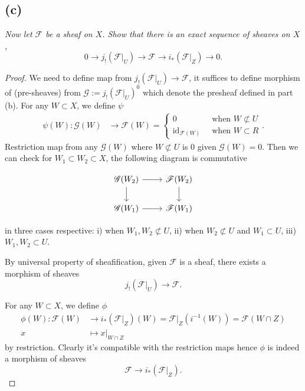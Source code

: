 \subsection{(c)}
\textit{Now let $\mathscr F$ be a sheaf on $X$. Show that there is an exact sequence of sheaves on $X$, \[0\to j_!(\mathscr F\vert_U)\to \mathscr F\to i_{\ast}(\mathscr F\vert_Z)\to 0.\]}

\begin{proof}
We need to define map from $j_!(\mathscr F\vert_U)\to \mathscr F$, it suffices to define morphism of (pre-sheaves) from $\mathscr G:=j_!(\mathscr F\vert_U)^0$ which denote the presheaf defined in part (b). For any $W\subset X$, we define $\psi$
\begin{align*}
    \psi(W):\mathscr G(W) &\to \mathscr F(W) = \begin{cases}
        0 &~ \text{ when } W\not\subset U\\
        \operatorname{id}_{\mathscr F(W)} &~ \text{ when } W\subset R
    \end{cases}.
\end{align*} Restriction map from any $\mathscr G(W)$ where $W\not\subset U$ is $0$ given $\mathscr G(W)=0$. Then we can check for $W_1\subset W_2\subset X$, the following diagram is commutative

\[\begin{tikzcd}
	{\mathscr G(W_2)} & {\mathscr F(W_2)} \\
	{\mathscr G(W_1)} & {\mathscr F(W_1)}
	\arrow[from=1-1, to=1-2]
	\arrow[from=1-1, to=2-1]
	\arrow[from=1-2, to=2-2]
	\arrow[from=2-1, to=2-2]
\end{tikzcd}\]

in three cases respective: i) when $W_1,W_2\not\subset U$, ii) when $W_2\not\subset U$ and $W_1\subset U$, iii) $W_1,W_2\subset U$.

By universal property of sheafification, given $\mathscr F$ is a sheaf, there exists a morphism of sheaves \[j_!(\mathscr F\vert_U)\to\mathscr F.\]

For any $W\subset X$, we define $\phi$ 
\begin{align*}
    \phi(W):\mathscr F(W) &\to i_{\ast}(\mathscr F\vert_Z)(W)=\mathscr F\vert_Z(i^{-1}(W))=\mathscr F(W\cap Z) \\
    x &\mapsto x\vert_{W\cap Z}
\end{align*}by restriction. Clearly it's compatible with the restriction maps hence $\phi$ is indeed a morphism of sheaves
\[\mathscr F\to i_{\ast}(\mathscr F\vert_Z).\] 


\end{proof}
